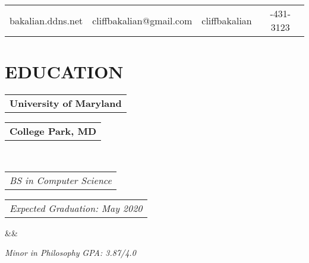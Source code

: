 \documentclass[11pt,a4paper,roman]{moderncv}
\makeatletter
\newcommand*{\customcventry}[7][.25em]{
  \begin{tabular}{@{}l} 
    {\bfseries #4}
  \end{tabular}
  \hfill
  \begin{tabular}{l@{}}
     {\bfseries #5}
  \end{tabular} \\
  \begin{tabular}{@{}l} 
    {\itshape #3}
  \end{tabular}
  \hfill
  \begin{tabular}{l@{}}
     {\itshape #2}
  \end{tabular}
  \ifx&#7&%
  \else{\\%
    \begin{minipage}{\maincolumnwidth}%
      \small#7%
    \end{minipage}}\fi%
  \par\addvspace{#1}}
\makeatother
\begin{document}
\makecvtitle
\vspace*{-23mm}

\begin{center}
\begin{tabular}{ c c c c }
 \enspace bakalian.ddns.net & \enspace cliffbakalian@gmail.com & \enspace cliffbakalian & \enspace 215-431-3123\\  
\end{tabular}
\end{center}

\section{EDUCATION}
{\customcventry{Expected Graduation: May 2020}{BS in Computer Science}{University of Maryland}{College Park, MD}{}{}}
{\itshape Minor in Philosophy} \hfill {\itshape GPA: 3.87/4.0}
\end{document}
